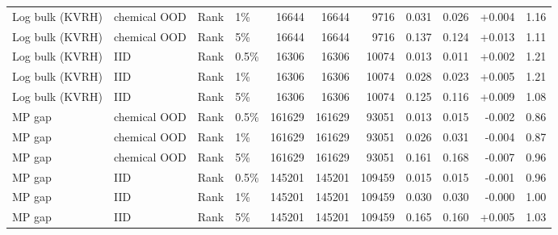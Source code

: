 \begin{tabular}{llllrrrrrrr}
Log bulk (KVRH) & chemical OOD & Rank & 1\% & 16644 & 16644 & 9716 & 0.031 & 0.026 & +0.004 & 1.16 \\
Log bulk (KVRH) & chemical OOD & Rank & 5\% & 16644 & 16644 & 9716 & 0.137 & 0.124 & +0.013 & 1.11 \\
Log bulk (KVRH) & IID & Rank & 0.5\% & 16306 & 16306 & 10074 & 0.013 & 0.011 & +0.002 & 1.21 \\
Log bulk (KVRH) & IID & Rank & 1\% & 16306 & 16306 & 10074 & 0.028 & 0.023 & +0.005 & 1.21 \\
Log bulk (KVRH) & IID & Rank & 5\% & 16306 & 16306 & 10074 & 0.125 & 0.116 & +0.009 & 1.08 \\
MP gap & chemical OOD & Rank & 0.5\% & 161629 & 161629 & 93051 & 0.013 & 0.015 & -0.002 & 0.86 \\
MP gap & chemical OOD & Rank & 1\% & 161629 & 161629 & 93051 & 0.026 & 0.031 & -0.004 & 0.87 \\
MP gap & chemical OOD & Rank & 5\% & 161629 & 161629 & 93051 & 0.161 & 0.168 & -0.007 & 0.96 \\
MP gap & IID & Rank & 0.5\% & 145201 & 145201 & 109459 & 0.015 & 0.015 & -0.001 & 0.96 \\
MP gap & IID & Rank & 1\% & 145201 & 145201 & 109459 & 0.030 & 0.030 & -0.000 & 1.00 \\
MP gap & IID & Rank & 5\% & 145201 & 145201 & 109459 & 0.165 & 0.160 & +0.005 & 1.03 \\
\bottomrule
\end{tabular}
